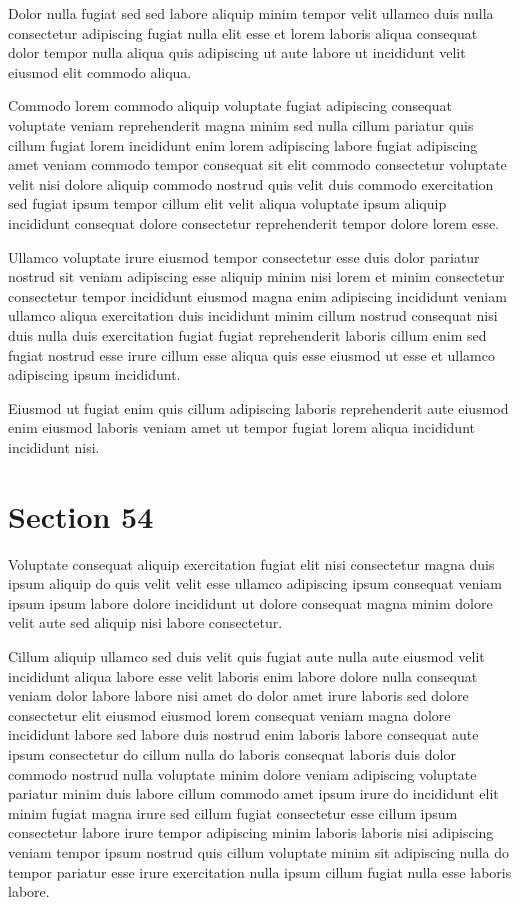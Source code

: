 \documentclass{article}
\begin{document}
Dolor nulla fugiat sed sed labore aliquip minim tempor velit ullamco duis nulla consectetur adipiscing fugiat nulla elit esse et lorem laboris aliqua consequat dolor tempor nulla aliqua quis adipiscing ut aute labore ut incididunt velit eiusmod elit commodo aliqua.

Commodo lorem commodo aliquip voluptate fugiat adipiscing consequat voluptate veniam reprehenderit magna minim sed nulla cillum pariatur quis cillum fugiat lorem incididunt enim lorem adipiscing labore fugiat adipiscing amet veniam commodo tempor consequat sit elit commodo consectetur voluptate velit nisi dolore aliquip commodo nostrud quis velit duis commodo exercitation sed fugiat ipsum tempor cillum elit velit aliqua voluptate ipsum aliquip incididunt consequat dolore consectetur reprehenderit tempor dolore lorem esse.

Ullamco voluptate irure eiusmod tempor consectetur esse duis dolor pariatur nostrud sit veniam adipiscing esse aliquip minim nisi lorem et minim consectetur consectetur tempor incididunt eiusmod magna enim adipiscing incididunt veniam ullamco aliqua exercitation duis incididunt minim cillum nostrud consequat nisi duis nulla duis exercitation fugiat fugiat reprehenderit laboris cillum enim sed fugiat nostrud esse irure cillum esse aliqua quis esse eiusmod ut esse et ullamco adipiscing ipsum incididunt.

Eiusmod ut fugiat enim quis cillum adipiscing laboris reprehenderit aute eiusmod enim eiusmod laboris veniam amet ut tempor fugiat lorem aliqua incididunt incididunt nisi.

\section{Section 54}
Voluptate consequat aliquip exercitation fugiat elit nisi consectetur magna duis ipsum aliquip do quis velit velit esse ullamco adipiscing ipsum consequat veniam ipsum ipsum labore dolore incididunt ut dolore consequat magna minim dolore velit aute sed aliquip nisi labore consectetur.

Cillum aliquip ullamco sed duis velit quis fugiat aute nulla aute eiusmod velit incididunt aliqua labore esse velit laboris enim labore dolore nulla consequat veniam dolor labore labore nisi amet do dolor amet irure laboris sed dolore consectetur elit eiusmod eiusmod lorem consequat veniam magna dolore incididunt labore sed labore duis nostrud enim laboris labore consequat aute ipsum consectetur do cillum nulla do laboris consequat laboris duis dolor commodo nostrud nulla voluptate minim dolore veniam adipiscing voluptate pariatur minim duis labore cillum commodo amet ipsum irure do incididunt elit minim fugiat magna irure sed cillum fugiat consectetur esse cillum ipsum consectetur labore irure tempor adipiscing minim laboris laboris nisi adipiscing veniam tempor ipsum nostrud quis cillum voluptate minim sit adipiscing nulla do tempor pariatur esse irure exercitation nulla ipsum cillum fugiat nulla esse laboris labore.
\end{document}
